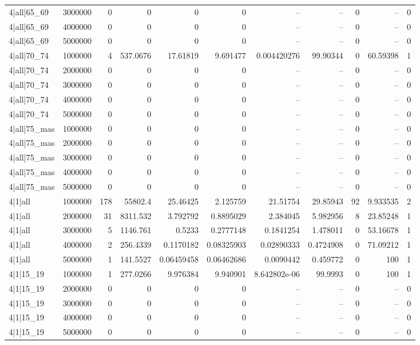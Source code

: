 \begin{tabular}{lrrrrrrrrrr}
4|all|65\_69 & 3000000 & 0 & 0 & 0 & 0 & -- & -- & 0 & -- & 0 \\
4|all|65\_69 & 4000000 & 0 & 0 & 0 & 0 & -- & -- & 0 & -- & 0 \\
4|all|65\_69 & 5000000 & 0 & 0 & 0 & 0 & -- & -- & 0 & -- & 0 \\
4|all|70\_74 & 1000000 & 4 & 537.0676 & 17.61819 & 9.691477 & 0.004420276 & 99.90344 & 0 & 60.59398 & 1 \\
4|all|70\_74 & 2000000 & 0 & 0 & 0 & 0 & -- & -- & 0 & -- & 0 \\
4|all|70\_74 & 3000000 & 0 & 0 & 0 & 0 & -- & -- & 0 & -- & 0 \\
4|all|70\_74 & 4000000 & 0 & 0 & 0 & 0 & -- & -- & 0 & -- & 0 \\
4|all|70\_74 & 5000000 & 0 & 0 & 0 & 0 & -- & -- & 0 & -- & 0 \\
4|all|75\_mas & 1000000 & 0 & 0 & 0 & 0 & -- & -- & 0 & -- & 0 \\
4|all|75\_mas & 2000000 & 0 & 0 & 0 & 0 & -- & -- & 0 & -- & 0 \\
4|all|75\_mas & 3000000 & 0 & 0 & 0 & 0 & -- & -- & 0 & -- & 0 \\
4|all|75\_mas & 4000000 & 0 & 0 & 0 & 0 & -- & -- & 0 & -- & 0 \\
4|all|75\_mas & 5000000 & 0 & 0 & 0 & 0 & -- & -- & 0 & -- & 0 \\
4|1|all & 1000000 & 178 & 55802.4 & 25.46425 & 2.125759 & 21.51754 & 29.85943 & 92 & 9.933535 & 2 \\
4|1|all & 2000000 & 31 & 8311.532 & 3.792792 & 0.8895029 & 2.384045 & 5.982956 & 8 & 23.85248 & 1 \\
4|1|all & 3000000 & 5 & 1146.761 & 0.5233 & 0.2777148 & 0.1841254 & 1.478011 & 0 & 53.16678 & 1 \\
4|1|all & 4000000 & 2 & 256.4339 & 0.1170182 & 0.08325903 & 0.02890333 & 0.4724908 & 0 & 71.09212 & 1 \\
4|1|all & 5000000 & 1 & 141.5527 & 0.06459458 & 0.06462686 & 0.0090442 & 0.459772 & 0 & 100 & 1 \\
4|1|15\_19 & 1000000 & 1 & 277.0266 & 9.976384 & 9.940901 & 8.642802e-06 & 99.9993 & 0 & 100 & 1 \\
4|1|15\_19 & 2000000 & 0 & 0 & 0 & 0 & -- & -- & 0 & -- & 0 \\
4|1|15\_19 & 3000000 & 0 & 0 & 0 & 0 & -- & -- & 0 & -- & 0 \\
4|1|15\_19 & 4000000 & 0 & 0 & 0 & 0 & -- & -- & 0 & -- & 0 \\
4|1|15\_19 & 5000000 & 0 & 0 & 0 & 0 & -- & -- & 0 & -- & 0 \\

\end{tabular}
